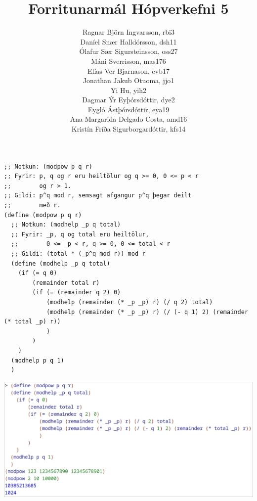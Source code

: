 \documentclass{article}
\title{Forritunarmál Hópverkefni 5}
\author{Ragnar Björn Ingvarsson, rbi3 \\
		Daníel Snær Halldórsson, dsh11 \\
		Ólafur Sær Sigursteinsson, oss27 \\
		Máni Sverrisson, mas176 \\
		Elías Ver Bjarnason, evb17 \\
		Jonathan Jakub Otuoma, jjo1 \\
		Yi Hu, yih2 \\
		Dagmar Ýr Eyþórsdóttir, dye2 \\
		Eygló Ástþórsdóttir, eya19 \\
		Ana Margarida Delgado Costa, amd16 \\
		Kristín Fríða Sigurborgardóttir, kfs14
	}
\begin{document}
\renewcommand\thepage{}
	
	\maketitle

	\newpage
	\setcounter{page}{1}
	\renewcommand\thepage{\arabic{page}}

	\section{}
	\begin{verbatim}
;; Notkun: (modpow p q r)
;; Fyrir: p, q og r eru heiltölur og q >= 0, 0 <= p < r
;;        og r > 1.
;; Gildi: p^q mod r, semsagt afgangur p^q þegar deilt
;;        með r.
(define (modpow p q r)
  ;; Notkun: (modhelp _p q total)
  ;; Fyrir: _p, q og total eru heiltölur,
  ;;        0 <= _p < r, q >= 0, 0 <= total < r
  ;; Gildi: (total * (_p^q mod r)) mod r
  (define (modhelp _p q total)
    (if (= q 0)
        (remainder total r)
        (if (= (remainder q 2) 0)
            (modhelp (remainder (* _p _p) r) (/ q 2) total)
            (modhelp (remainder (* _p _p) r) (/ (- q 1) 2) (remainder (* total _p) r))
            )
        )
    )
  (modhelp p q 1)
  )
	\end{verbatim}
	\begin{center}
		\includegraphics[scale=0.35]{modpow.png}
	\end{center}

	\newpage
\end{document}
